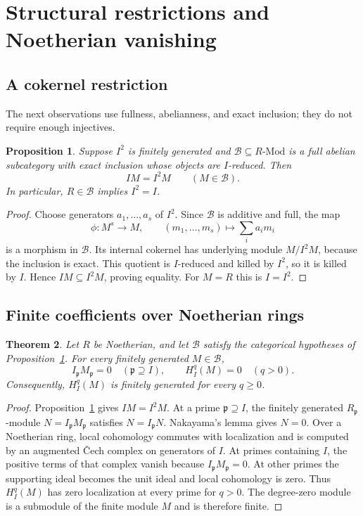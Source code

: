 \documentclass[11pt,reqno]{amsart}
\newtheorem{theorem}{Theorem}[section]
\newtheorem{proposition}[theorem]{Proposition}
\theoremstyle{definition}
\theoremstyle{remark}
\newcommand{\Mod}{\text{-}\mathrm{Mod}}
\begin{document}
\section{Structural restrictions and Noetherian vanishing}\label{sec:structural}
\subsection{A cokernel restriction}
The next observations use fullness, abelianness, and exact inclusion; they do not require enough injectives.
\begin{proposition}\label{prop:coreduced}
Suppose $I^2$ is finitely generated and $\mathcal B\subseteq R\Mod$ is a full abelian subcategory with exact inclusion whose objects are $I$-reduced. Then
\[
IM=I^2M\qquad(M\in\mathcal B).
\]
In particular, $R\in\mathcal B$ implies $I^2=I$.
\end{proposition}
\begin{proof}
Choose generators $a_1,\ldots,a_s$ of $I^2$. Since $\mathcal B$ is additive and full, the map
\[
\phi:M^s\to M,\qquad (m_1,\ldots,m_s)\mapsto\sum_i a_i m_i
\]
is a morphism in $\mathcal B$. Its internal cokernel has underlying module $M/I^2M$, because the inclusion is exact. This quotient is $I$-reduced and killed by $I^2$, so it is killed by $I$. Hence $IM\subseteq I^2M$, proving equality. For $M=R$ this is $I=I^2$.
\end{proof}

\subsection{Finite coefficients over Noetherian rings}
\begin{theorem}\label{thm:finite-vanishing}
Let $R$ be Noetherian, and let $\mathcal B$ satisfy the categorical hypotheses of Proposition~\ref{prop:coreduced}. For every finitely generated $M\in\mathcal B$,
\[
I_{\mathfrak p}M_{\mathfrak p}=0\quad(\mathfrak p\supseteq I),
\qquad
H_I^q(M)=0\quad(q>0).
\]
Consequently, $H_I^q(M)$ is finitely generated for every $q\geq0$.
\end{theorem}
\begin{proof}
Proposition~\ref{prop:coreduced} gives $IM=I^2M$. At a prime $\mathfrak p\supseteq I$, the finitely generated $R_{\mathfrak p}$-module $N=I_{\mathfrak p}M_{\mathfrak p}$ satisfies $N=I_{\mathfrak p}N$. Nakayama's lemma gives $N=0$. Over a Noetherian ring, local cohomology commutes with localization and is computed by an augmented \v{C}ech complex on generators of $I$. At primes containing $I$, the positive terms of that complex vanish because $I_{\mathfrak p}M_{\mathfrak p}=0$. At other primes the supporting ideal becomes the unit ideal and local cohomology is zero. Thus $H_I^q(M)$ has zero localization at every prime for $q>0$. The degree-zero module is a submodule of the finite module $M$ and is therefore finite.
\end{proof}
\end{document}
